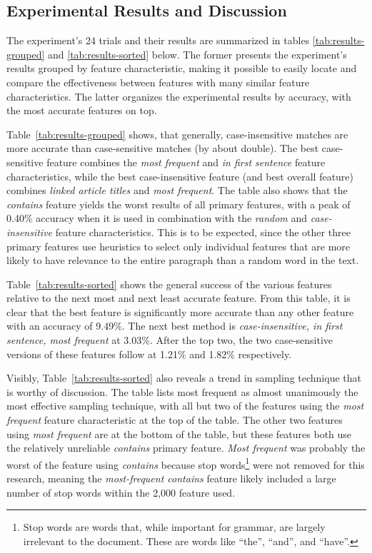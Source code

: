 \subsection{Experimental Results and Discussion}

The experiment's 24 trials and their results are summarized in tables \ref{tab:results-grouped} and \ref{tab:results-sorted} below.
The former presents the experiment's results grouped by feature characteristic, making it possible to easily locate and compare the effectiveness between features with many similar feature characteristics.
The latter organizes the experimental results by accuracy, with the most accurate features on top.

Table~\ref{tab:results-grouped} shows, that generally, case-insensitive matches are more accurate than case-sensitive matches (by about double).
The best case-sensitive feature combines the {\it most frequent} and {\it in first sentence} feature characteristics, while the best case-insensitive feature (and best overall feature) combines {\it linked article titles} and {\it most frequent}.
The table also shows that the {\it contains} feature yields the worst results of all primary features, with a peak of 0.40\% accuracy when it is used in combination with the {\it random} and {\it case-insensitive} feature characteristics.
This is to be expected, since the other three primary features use heuristics to select only individual features that are more likely to have relevance to the entire paragraph than a random word in the text.

Table~\ref{tab:results-sorted} shows the general success of the various features relative to the next most and next least accurate feature.
From this table, it is clear that the best feature is significantly more accurate than any other feature with an accuracy of 9.49\%.
The next best method is {\it case-insensitive, in first sentence, most frequent} at 3.03\%.
After the top two, the two case-sensitive versions of these features follow at 1.21\% and 1.82\% respectively.

Visibly, Table~\ref{tab:results-sorted} also reveals a trend in sampling technique that is worthy of discussion.
The table lists most frequent as almost unanimously the most effective sampling technique, with all but two of the features using the {\it most frequent} feature characteristic at the top of the table.
The other two features using {\it most frequent} are at the bottom of the table, but these features both use the relatively unreliable {\it contains} primary feature.
{\it Most frequent} was probably the worst of the feature using {\it contains} because stop words\footnote{Stop words are words that, while important for grammar, are largely irrelevant to the document. These are words like ``the'', ``and'', and ``have''.} were not removed for this research, meaning the {\it most-frequent contains} feature likely included a large number of stop words within the 2,000 feature used.

